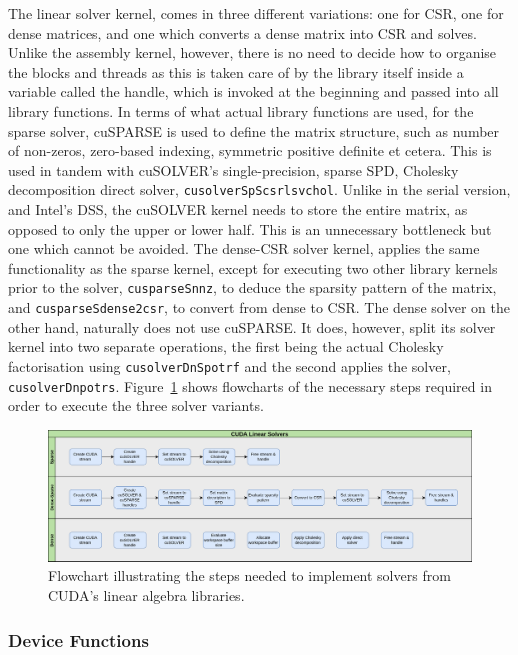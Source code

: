 The linear solver kernel, comes in three different variations: one for CSR, one for dense matrices, and one which converts a dense matrix into CSR and solves. Unlike the assembly kernel, however, there is no need to decide how to organise the blocks and threads as this is taken care of by the library itself inside a variable called the handle, which is invoked at the beginning and passed into all library functions. In terms of what actual library functions are used, for the sparse solver, cuSPARSE is used to define the matrix structure, such as number of non-zeros, zero-based indexing, symmetric positive definite et cetera. This is used in tandem with cuSOLVER's single-precision, sparse SPD, Cholesky decomposition direct solver, \texttt{cusolverSpScsrlsvchol}. Unlike in the serial version, and Intel's DSS, the cuSOLVER kernel needs to store the entire matrix, as opposed to only the upper or lower half. This is an unnecessary bottleneck but one which cannot be avoided. The dense-CSR solver kernel, applies the same functionality as the sparse kernel, except for executing two other library kernels prior to the solver, \texttt{cusparseSnnz}, to deduce the sparsity pattern of the matrix, and \texttt{cusparseSdense2csr}, to convert from dense to CSR. The dense solver on the other hand, naturally does not use cuSPARSE. It does, however, split its solver kernel into two separate operations, the first being the actual Cholesky factorisation using \texttt{cusolverDnSpotrf} and the second applies the solver, \texttt{cusolverDnpotrs}. Figure~\ref{fig:cusolvers} shows flowcharts of the necessary steps required in order to execute the three solver variants.
\begin{figure}
	\centering
	\includegraphics[width=0.9\linewidth]{Figures/cuda_solvers}
	\caption{Flowchart illustrating the steps needed to implement solvers from CUDA's linear algebra libraries.}
	\label{fig:cusolvers}
\end{figure}

\subsubsection{Device Functions}

